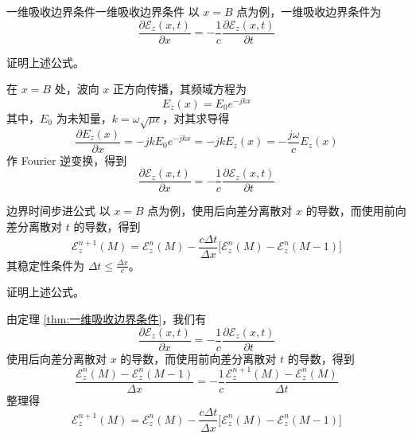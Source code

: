 \begin{theorem}{一维吸收边界条件}{一维吸收边界条件}
    以 $x=B$ 点为例，一维吸收边界条件为
    \begin{equation}
        \frac{\partial \mathscr{E}_z(x,t)}{\partial x}
        =-\frac{1}{c}\frac{\partial \mathscr{E}_z(x,t)}{\partial t}
    \end{equation}
\end{theorem}

\begin{exercise}
    证明上述公式。
\end{exercise}

\begin{solution}
    在 $x=B$ 处，波向 $x$ 正方向传播，其频域方程为
    \begin{equation*}
        E_z(x)=E_0e^{-jkx}
    \end{equation*}
    其中，$E_0$ 为未知量，$k=\omega\sqrt{\mu \epsilon}$，对其求导得
    \begin{equation*}
        \frac{\partial E_z(x)}{\partial x}=-jkE_0e^{-jkx}=-jkE_z(x)
        =-\frac{j\omega}{c}E_z(x)
    \end{equation*}
    作 Fourier 逆变换，得到
    \begin{equation*}
        \frac{\partial \mathscr{E}_z(x,t)}{\partial x}
        =-\frac{1}{c}\frac{\partial \mathscr{E}_z(x,t)}{\partial t}
    \end{equation*}
\end{solution}

\begin{theorem}{边界时间步进公式}
    以 $x=B$ 点为例，使用后向差分离散对 $x$ 的导数，而使用前向差分离散对 $t$ 的导数，得到
    \begin{equation}
        \mathscr{E}_z^{n+1}(M)=\mathscr{E}_z^{n}(M)
        -\frac{c\Delta t}{\Delta x}
        \Big[\mathscr{E}_z^{n}(M)-\mathscr{E}_z^{n}(M-1)\Big]
    \end{equation}
    其稳定性条件为 $\Delta t \leq \frac{\Delta x}{c}$。
\end{theorem}

\begin{exercise}
    证明上述公式。
\end{exercise}

\begin{solution}
    由定理 \ref{thm:一维吸收边界条件}，我们有
    \begin{equation*}
        \frac{\partial \mathscr{E}_z(x,t)}{\partial x}
        =-\frac{1}{c}\frac{\partial \mathscr{E}_z(x,t)}{\partial t}
    \end{equation*}
    使用后向差分离散对 $x$ 的导数，而使用前向差分离散对 $t$ 的导数，得到
    \begin{equation*}
        \frac{\mathscr{E}_z^{n}(M)-\mathscr{E}_z^{n}(M-1)}{\Delta x}
        =-\frac{1}{c}\frac{\mathscr{E}_z^{n+1}(M)-\mathscr{E}_z^{n}(M)}{\Delta t}
    \end{equation*}
    整理得
    \begin{equation*}
        \mathscr{E}_z^{n+1}(M)=\mathscr{E}_z^{n}(M)
        -\frac{c\Delta t}{\Delta x}
        \Big[\mathscr{E}_z^{n}(M)-\mathscr{E}_z^{n}(M-1)\Big]
    \end{equation*}
\end{solution}

